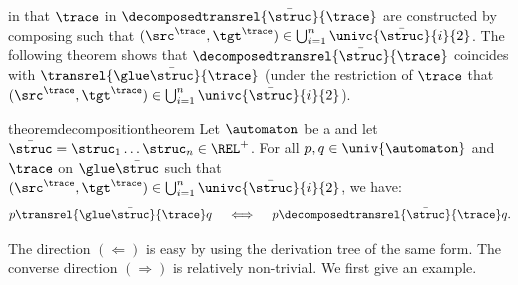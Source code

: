 \documentclass[10pt,a4paper]{article}
\theoremstyle{definition}
\theoremstyle{remark}
\DeclarePairedDelimiter\tuple{(}{)}
\newcommand{\mul}[1]{\bar{#1}}
\begin{document}
in that  $\trace$ in $\decomposedtransrel{\mul{\struc}}{\trace}$ are
constructed by composing  such that $\tuple{\src^{\trace}, \tgt^{\trace}} \in \bigcup_{i = 1}^n \univc{\mul{\struc}}{i}{2}$.
The following theorem shows that $\decomposedtransrel{\mul{\struc}}{\trace}$ coincides with $\transrel{\glue \mul{\struc}}{\trace}$
(under the restriction of  $\trace$ that $\tuple{\src^{\trace}, \tgt^{\trace}} \in \bigcup_{i = 1}^n \univc{\mul{\struc}}{i}{2}$).
\begin{restatable}{theorem}{decompositiontheorem}\label{theorem: decomposition}
    Let $\automaton$ be a  and let $\mul{\struc} = \struc_1 \dots \struc_n \in \REL^{+}$.
    For all $p, q \in \univ{\automaton}$ and  $\trace$ on $\glue\mul{\struc}$ such that $\tuple{\src^{\trace}, \tgt^{\trace}} \in \bigcup_{i = 1}^n \univc{\mul{\struc}}{i}{2}$,
    we have:
    \[p \transrel{\glue \mul{\struc}}{\trace} q \quad\iff\quad p \decomposedtransrel{\mul{\struc}}{\trace} q.\]
\end{restatable}
The direction $(\Longleftarrow)$ is easy by using the derivation tree of the same form.
The converse direction $(\Longrightarrow)$ is relatively non-trivial.
We first give an example.
\end{document}

